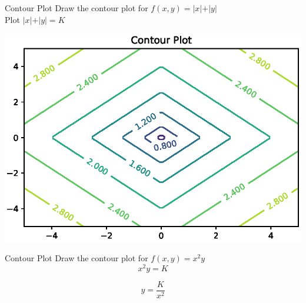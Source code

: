 \documentclass{beamer}
\begin{document}
\begin{frame}{Contour Plot}
    Draw the contour plot for $f(x,y) = \vert x \vert + \vert y \vert $\\
    
    Plot $\vert x \vert + \vert y \vert = K$\\
     \begin{center}
     \includegraphics[totalheight=6cm]{ml-maths/contour-plot-3.eps}
 \end{center}
\end{frame}



\begin{frame}{Contour Plot}
    Draw the contour plot for $f(x,y) = x^{2}y$\\
    \begin{equation*}
        x^{2}y = K
    \end{equation*}
    
    \begin{equation*}
        y = \frac{K}{x^{2}}
    \end{equation*}
\end{frame}
\end{document}

